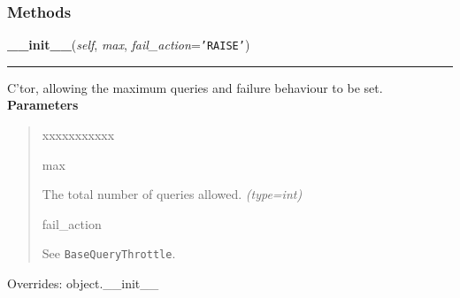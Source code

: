   \subsubsection{Methods}

    \vspace{0.5ex}

\hspace{.8\funcindent}\begin{boxedminipage}{\funcwidth}

    \raggedright \textbf{\_\_init\_\_}(\textit{self}, \textit{max}, \textit{fail\_action}={\tt \texttt{'}\texttt{RAISE}\texttt{'}})

    \vspace{-1.5ex}

    \rule{\textwidth}{0.5\fboxrule}
\setlength{\parskip}{2ex}

C'tor, allowing the maximum queries and failure behaviour to be set.
\setlength{\parskip}{1ex}
      \textbf{Parameters}
      \vspace{-1ex}

      \begin{quote}
        \begin{Ventry}{xxxxxxxxxxx}

          \item[max]


The total number of queries allowed.
            {\it (type=int)}

          \item[fail\_action]


See \texttt{BaseQueryThrottle}.
        \end{Ventry}

      \end{quote}

      Overrides: object.\_\_init\_\_

    \end{boxedminipage}

    \vspace{0.5ex}

